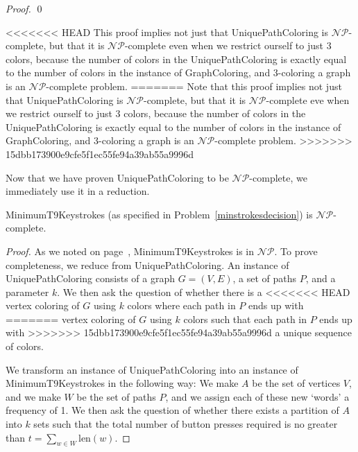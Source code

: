 \documentclass[runningheads]{llncs}
\newcommand{\NP}{\ensuremath{\mathcal{NP}}}
\begin{document}
\begin{prob}[{\sc
MinimumKeystrokes}]
\begin{proof}
\qed 
\end{proof}

<<<<<<< HEAD
This proof implies not just that {\sc UniquePathColoring} is \NP-complete, but that it is \NP-complete even when we restrict ourself to just 3 colors, because the number of colors in the {\sc UniquePathColoring} is exactly equal to the number of colors in the instance of {\sc GraphColoring}, and 3-coloring a graph is an \NP-complete problem\cite{3color}.
=======
Note that this proof implies not just that {\sc UniquePathColoring} is \NP-complete, but that it is \NP-complete eve when we restrict ourself to just 3 colors, because the number of colors in the {\sc UniquePathColoring} is exactly equal to the number of colors in the instance of {\sc GraphColoring}, and 3-coloring a graph is an \NP-complete problem\cite{3color}.
>>>>>>> 15dbb173900e9cfe5f1ec55fe94a39ab55a9996d

Now that we have proven {\sc UniquePathColoring} to be \NP-complete, we
immediately use it in a reduction.  
\begin{theorem}{\sc MinimumT9Keystrokes} (as specified in
Problem~\ref{minstrokesdecision}) is \NP-complete.  \end{theorem}

\begin{proof}
As we noted on page~\pageref{minstrokesdecision}, {\sc MinimumT9Keystrokes} is
in \NP.  To prove completeness, we reduce from {\sc UniquePathColoring}.  An
instance of {\sc UniquePathColoring} consists of a graph $G=(V,E)$, a set of
paths $P$, and a parameter $k$.  We then ask the question of whether there is a
<<<<<<< HEAD
vertex coloring of $G$ using $k$ colors where each path in $P$ ends up with
=======
vertex coloring of $G$ using $k$ colors such that each path in $P$ ends up with
>>>>>>> 15dbb173900e9cfe5f1ec55fe94a39ab55a9996d
a unique sequence of colors.

We transform an instance of {\sc UniquePathColoring} into an instance of {\sc
MinimumT9Keystrokes} in the following way:  We make $A$ be the set of vertices
$V$, and we make $W$ be the set of paths $P$, and we assign each of these new
`words' a frequency of 1.  We then ask the question of whether there exists a
partition of $A$ into $k$ sets such that the total number of button presses
required is no greater than $t=\sum_{w\in W} \mathrm{len}(w)$.


\end{proof}
\end{prob}
\end{document}

